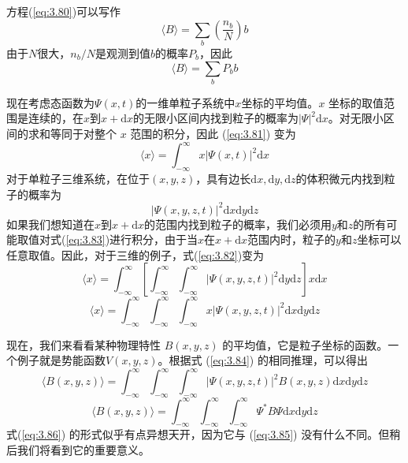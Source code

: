 	方程(\ref{eq:3.80})可以写作
	\begin{equation*}
		\langle B \rangle = \sum_{b}\left(\frac{n_b}{N}\right)b
	\end{equation*}
	由于$N$很大，$n_b/N$是观测到值$b$的概率$P_b$，因此
	\begin{equation}
		\langle B \rangle = \sum_{b}P_bb
		\label{eq:3.81}
	\end{equation}

	现在考虑态函数为$\Psi\left(x,t\right)$的一维单粒子系统中$x$坐标的平均值。$x$ 坐标的取值范围是连续的，在$x$到$x+\mathrm{d}x$的无限小区间内找到粒子的概率为$\left|\Psi\right|^2\mathrm{d}x$。对无限小区间的求和等同于对整个 $x$ 范围的积分，因此 (\ref{eq:3.81}) 变为
	\begin{equation}
		\langle x \rangle = \int_{-\infty}^{\infty}x\left|\Psi\left(x,t\right)\right|^2\mathrm{d}x
		\label{eq:3.82}
	\end{equation}
	对于单粒子三维系统，在位于$\left(x,y,z\right)$，具有边长$\mathrm{d}x,\mathrm{d}y,\mathrm{d}z$的体积微元内找到粒子的概率为
	\begin{equation}
		\left|\Psi\left(x,y,z,t\right)\right|^2\mathrm{d}x\mathrm{d}y\mathrm{d}z
		\label{eq:3.83}
	\end{equation}
	如果我们想知道在$x$到$x+\mathrm{d}x$的范围内找到粒子的概率，我们必须用$y$和$z$的所有可能取值对式(\ref{eq:3.83})进行积分，由于当$x$在$x+\mathrm{d}x$范围内时，粒子的$y$和$z$坐标可以任意取值。因此，对于三维的例子，式(\ref{eq:3.82})变为
	\begin{equation}
		\langle x \rangle = \int_{-\infty}^{\infty}\left[\int_{-\infty}^{\infty}\int_{-\infty}^{\infty}\left|\Psi\left(x,y,z,t\right)\right|^2\mathrm{d}y\mathrm{d}z\right]x\mathrm{d}x
		\label{eq:3.84}
	\end{equation}
	\begin{equation*}
		\langle x \rangle = \int_{-\infty}^{\infty}\int_{-\infty}^{\infty}\int_{-\infty}^{\infty}x\left|\Psi\left(x,y,z,t\right)\right|^2\mathrm{d}x\mathrm{d}y\mathrm{d}z
	\end{equation*}

	现在，我们来看看某种物理特性 $B\left(x,y,z\right)$ 的平均值，它是粒子坐标的函数。一个例子就是势能函数$V\left(x,y,z\right)$。根据式 (\ref{eq:3.84}) 的相同推理，可以得出
	\begin{equation}
		\langle B\left(x,y,z\right) \rangle = \int_{-\infty}^{\infty}\int_{-\infty}^{\infty}\int_{-\infty}^{\infty}\left|\Psi\left(x,y,z,t\right)\right|^2B\left(x,y,z\right)\mathrm{d}x\mathrm{d}y\mathrm{d}z
		\label{eq:3.85}
	\end{equation}
	\begin{equation}
		\langle B\left(x,y,z\right) \rangle = \int_{-\infty}^{\infty}\int_{-\infty}^{\infty}\int_{-\infty}^{\infty}\Psi^{\ast}B\Psi\mathrm{d}x\mathrm{d}y\mathrm{d}z
		\label{eq:3.86}
	\end{equation}
	式(\ref{eq:3.86}) 的形式似乎有点异想天开，因为它与 (\ref{eq:3.85}) 没有什么不同。但稍后我们将看到它的重要意义。

